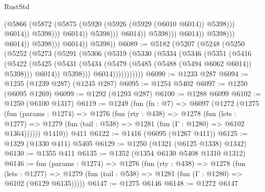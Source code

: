 \begin{lexlean}{RustStd}
\begin{coremodule}
{\begin{coremodule}
{{{{{{{{{{{{{                                                          (@5866
                                                            (@5872
                                                              (@5875
                                                                (@5920
                                                                  (@5926
                                                                    (@5929 (@6010 @6014))
                                                                    @5398)))
                                                              @6014))
                                                          @5398)))
                                                    @6014))
                                                @5398)))
                                          @6014))
                                      @5398)))
                                @6014))
                            @5398)))
                      @6014))
                  @5398)))
            @6014))
        @5398))
@6089 := @5182
    (@5207
      (@5248
        (@5250
          (@5252
            (@5273
              (@5291
                (@5306
                  (@5319
                    (@5330
                      (@5334
                        (@5346
                          (@5351
                            (@5416
                              (@5422
                                (@5425
                                  (@5431
                                    (@5434 (@5479 (@5485 (@5488 (@5494 @6062 @6014)) @5398)))
                                    @6014))
                                @5398)))
                          @6014)))))))))))
@6090 := @1233 @287
@6094 := @1235 (@1239 @287) (@1245 @287)
@6095 := @1254 @5402
@6097 := @1250 (@6095 @1269)
@6099 := @1292 (@1293 @287)
@6100 := @1288 @6099
@6102 := @1250 (@6100 @1317)
@6119 := @1249
    (fun (fn : @7) =>
    @6097
      (@1272
        (@1275
          (fun (params : @1274) =>
          @1276
            (fun (rty : @438) =>
            @1278
              (fun (lets : @1277) =>
              @1279 (fun (tail : @538) => @1281 (fun (Γ : @1280) => @6102 @1364))))))
        @1410))
    @411
@6122 := @1416 (@6095 (@1267 @411))
@6125 := @1329 (@1330 @411) @5405
@6129 := @1250 (@1321 (@6125 @1338) @1342)
@6130 := @1355 @411
@6135 := @1352 (@1354 @6130 @5408 @1310 @1312)
@6146 := fun (params : @1274) =>
  @1276
    (fun (rty : @438) =>
    @1278
      (fun (lets : @1277) =>
      @1279 (fun (tail : @538) => @1281 (fun (Γ : @1280) => @6102 (@6129 @6135)))))
@6147 := @1275 @6146
@6148 := @1272 @6147
}}}}}}}}}}}}}
\end{coremodule}}
\end{coremodule}
\end{lexlean}
